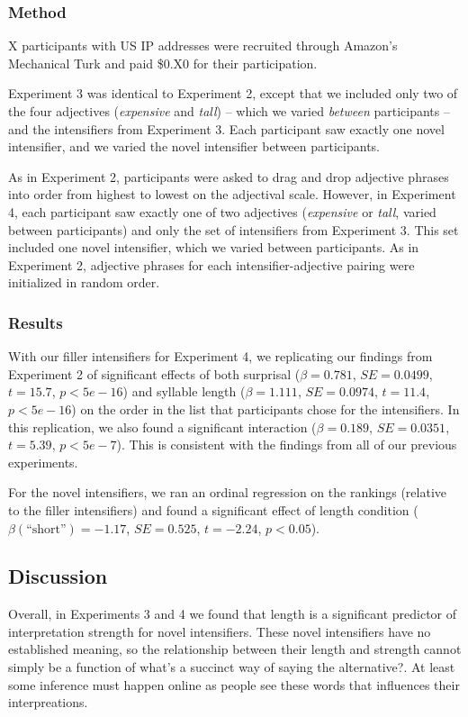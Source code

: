 \documentclass[a4paper,10pt]{article}
\newcommand{\w}[1]{\emph{#1}}
\newcommand{\todo}[1]{{\color{red}#1}}
\begin{document}
    \subsubsection{Method}
      X participants with US IP addresses were recruited through Amazon's Mechanical Turk and paid \$0.X0 for their participation.
      
      Experiment 3 was identical to Experiment 2, except that we included only two of the four adjectives (\w{expensive} and \w{tall}) -- which we varied \emph{between} participants -- and the intensifiers from Experiment 3. Each participant saw exactly one novel intensifier, and we varied the novel intensifier between participants.
      
      As in Experiment 2, participants were asked to drag and drop adjective phrases into order from highest to lowest on the adjectival scale. However, in Experiment 4, each participant saw exactly one of two adjectives (\w{expensive} or \w{tall}, varied between participants) and only the set of intensifiers from Experiment 3. This set included one novel intensifier, which we varied between participants. As in Experiment 2, adjective phrases for each intensifier-adjective pairing were initialized in random order.

    \subsubsection{Results}
      With our filler intensifiers for Experiment 4, we replicating our findings from Experiment 2 of significant effects of both surprisal ($\beta=0.781$, $SE=0.0499$, $t=15.7$, $p<5e-16$)
      and syllable length ($\beta=1.111$, $SE=0.0974$, $t=11.4$, $p<5e-16$) on the order in the list that participants chose for the intensifiers.
      In this replication, we also found a significant
      interaction ($\beta=0.189$, $SE=0.0351$, $t=5.39$, $p<5e-7$). This is consistent with the findings from all of our previous experiments.
      
      For the novel intensifiers, we ran an ordinal regression on the rankings (relative to the filler intensifiers) and found a significant effect of length condition ($\beta(\mbox{``short''})=-1.17$, $SE=0.525$, $t=-2.24$, $p<0.05$).

    \subsection{Discussion}
      Overall, in Experiments 3 and 4 we found that length is a significant predictor of interpretation strength for novel intensifiers. These novel intensifiers have no established meaning, so the relationship between their length and strength cannot simply be a function of \todo{what's a succinct way of saying the alternative?}. At least some inference must happen online as people see these words that influences their interpreations.
      
\end{document}
